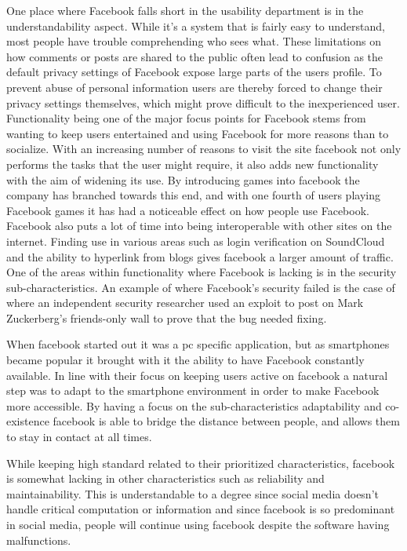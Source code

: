 \documentclass[conference]{IEEEtran}
\begin{document}
One place where Facebook falls short in the usability department is in the understandability aspect. While it’s a system that is fairly easy to understand, most people have trouble comprehending who sees what. These limitations on how comments or posts are shared to the public often lead to confusion as the default privacy settings of Facebook expose large parts of the users profile\cite{paul2011}. To prevent abuse of personal information users are thereby forced to change their privacy settings themselves, which might prove difficult to the inexperienced user.
Functionality being one of the major focus points for Facebook stems from wanting to keep users entertained and using Facebook for more reasons than to socialize. With an increasing number of reasons to visit the site facebook not only performs the tasks that the user might require, it also adds new functionality with the aim of widening its use. By introducing games into facebook the company has branched towards this end, and with one fourth of users playing Facebook games it has had a noticeable effect on how people use Facebook\cite{constine2012}. Facebook also puts a lot of time into being interoperable with other sites on the internet. Finding use in various areas such as login verification on SoundCloud and the ability to hyperlink from blogs gives facebook a larger amount of traffic. One of the areas within functionality where Facebook is lacking is in the security sub-characteristics. An example of where Facebook’s security failed is the case of where an independent security researcher used an exploit to post on Mark Zuckerberg’s friends-only wall to prove that the bug needed fixing\cite{kumparak2013}.
 
 When facebook started out it was a pc specific application, but as smartphones became popular it brought with it the ability to have Facebook constantly available. In line with their focus on keeping users active on facebook a natural step was to adapt to the smartphone environment in order to make Facebook more accessible. By having a focus on the sub-characteristics adaptability and co-existence facebook is able to bridge the distance between people, and allows them to stay in contact at all times.
 
 While keeping high standard related to their prioritized characteristics, facebook is somewhat lacking in other characteristics such as reliability and maintainability.
This is understandable to a degree since social media doesn’t handle critical computation or information and since facebook is so predominant in social media, people will continue using facebook despite the software having malfunctions.
\end{document}
